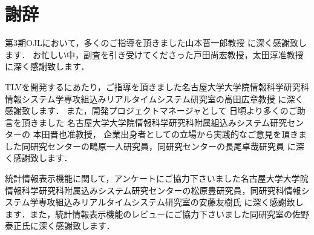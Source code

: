 ﻿\documentclass[12pt,report]{jsbook}
\begin{document}
















\chapter*{謝辞}
第3期OJLにおいて，多くのご指導を頂きました山本晋一郎教授
に深く感謝致します．
お忙しい中，副査を引き受けてくださった戸田尚宏教授，太田淳准教授
に深く感謝致します．

TLVを開発するにあたり，ご指導を頂きました名古屋大学大学院情報科学研究科
情報システム学専攻組込みリアルタイムシステム研究室の高田広章教授
に深く感謝致します．
また，開発プロジェクトマネージャとして
日頃より多くのご助言を頂きました
名古屋大学大学院情報科学研究科附属組込みシステム研究センターの
本田晋也准教授，
企業出身者としての立場から実践的なご意見を頂きました同研究センターの鴫原一人研究員，同研究センターの長尾卓哉研究員
に深く感謝致します．

統計情報表示機能に関して，アンケートにご協力下さいました名古屋大学大学院情報科学研究科附属込みシステム研究センターの松原豊研究員，同研究科情報システム学専攻組込みリアルタイムシステム研究室の安藤友樹氏
に深く感謝致します．また，統計情報表示機能のレビューにご協力下さいました同研究室の佐野泰正氏に深く感謝致します．
\end{document}
